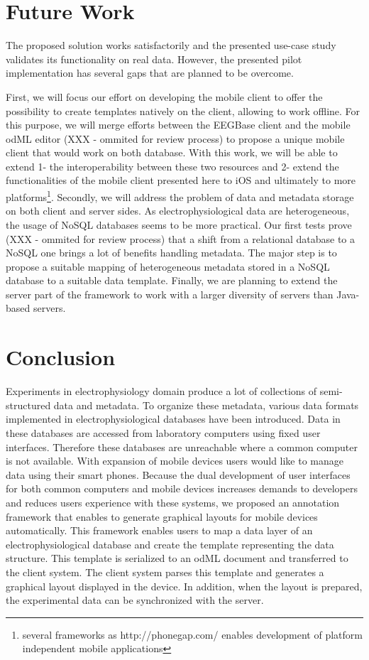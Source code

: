 \documentclass[a4paper,twoside]{article}
\begin{document}
\section{Future Work}

The proposed solution works satisfactorily and the presented use-case study validates its functionality on real data. However, the presented pilot implementation has several gaps that are planned to be overcome.

First, we will focus our effort on developing the mobile client to offer the possibility to create templates natively on the client, allowing to work offline. For this purpose, we will merge efforts between the EEGBase client and the mobile odML editor (XXX - ommited for review process) to propose a unique mobile client that would work on both database. With this work, we will be able to extend 1- the interoperability between these two resources and 2- extend the functionalities of the mobile client presented here to iOS and ultimately to more platforms\footnote{several frameworks as http://phonegap.com/ enables development of platform independent mobile applications}.
Secondly, we will address the problem of data and metadata storage on both client and server sides. As electrophysiological data are heterogeneous, the usage of NoSQL databases seems to be more practical. Our first tests prove (XXX - ommited for review process) that a shift from a relational database to a NoSQL one brings a lot of benefits handling metadata. The major step is to propose a suitable mapping of heterogeneous metadata stored in a NoSQL database to a suitable data template. Finally, we are planning to extend the server part of the framework to work with a larger diversity of servers than Java-based servers.



\section{Conclusion}




Experiments in electrophysiology domain produce a lot of collections of semi-structured data and metadata. To organize these metadata, various data formats implemented in electrophysiological databases have been introduced. Data in these databases are accessed from laboratory computers using fixed user interfaces. Therefore these databases are unreachable where a common computer is not available. With expansion of mobile devices users would like to manage data using their smart phones. Because the dual development of user interfaces for both common computers and mobile devices increases demands to developers and reduces users experience with these systems, we proposed an annotation framework that enables to generate graphical layouts for mobile devices automatically. This framework enables users to map a data layer of an electrophysiological database and create the template representing the data structure. This template is serialized to an odML document and transferred to the client system. The client system parses this template and generates a graphical layout displayed in the device. In addition, when the layout is prepared, the experimental data can be synchronized with the server.
\end{document}
